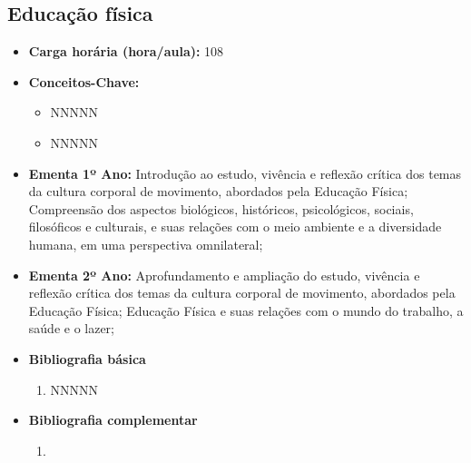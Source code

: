 \documentclass[11pt,fleqn]{book} %
\begin{document}
\subsection{Educação física}\label{disc:educacaofisica}
\begin{itemize}
	\item \textbf{Carga horária (hora/aula):} 108
	\item \textbf{Conceitos-Chave:}
	\begin{itemize}
		\item NNNNN
		\item NNNNN
	\end{itemize}
	\item \textbf{Ementa 1º Ano:} 
	Introdução ao estudo, vivência e reflexão crítica dos temas da cultura corporal de movimento, abordados pela Educação Física;
	Compreensão dos aspectos biológicos, históricos, psicológicos, sociais, filosóficos e culturais, e suas relações com o meio ambiente e a diversidade humana, em uma perspectiva omnilateral;
	
	\item \textbf{Ementa 2º Ano:} 
	Aprofundamento e ampliação do estudo, vivência e reflexão crítica dos temas da cultura corporal de movimento, abordados pela Educação Física;
	Educação Física e suas relações com o mundo do trabalho, a saúde e o lazer;	
	\item \textbf{Bibliografia básica}
	\begin{enumerate}
		\item NNNNN
	\end{enumerate}
	\item \textbf{Bibliografia complementar}
	\begin{enumerate}
		\item 
	\end{enumerate}	
\end{itemize}

\newpage
\end{document}
